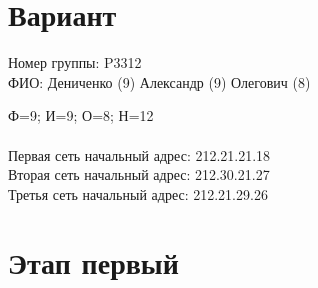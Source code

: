 \documentclass{article}
\begin{document}
\section*{Вариант}

Номер группы: P3312
\\
ФИО: Дениченко (9) Александр (9) Олегович (8)

Ф=9; И=9; О=8; Н=12
\\ \\
Первая сеть начальный адрес: 212.21.21.18
\\
Вторая сеть начальный адрес: 212.30.21.27
\\
Третья сеть начальный адрес: 212.21.29.26



\section{Этап первый}
\end{document}
